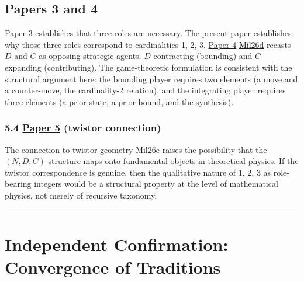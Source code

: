 \documentclass[12pt]{article}
\begin{document}
\subsection{Papers 3 and 4}\label{papers-3-and-4}

\href{https://github.com/baardev/truevalue/blob/main/docnav/Research/papers/3_minimal-recursive-triadic-framework/3_minimal-recursive-triadic-framework.pdf}{Paper
3} establishes that three roles are necessary. The present paper
establishes why those three roles correspond to cardinalities 1, 2, 3.
\href{https://github.com/baardev/truevalue/blob/main/docnav/Research/papers/4_game-theoretic-triadic-balance/4_game-theoretic-triadic-balance.pdf}{Paper
4}
\href{https://github.com/baardev/truevalue/blob/main/docnav/Research/papers/4_game-theoretic-triadic-balance/4_game-theoretic-triadic-balance.pdf}{Mil26d}
recasts \(D\) and \(C\) as opposing strategic agents: \(D\) contracting
(bounding) and \(C\) expanding (contributing). The game-theoretic
formulation is consistent with the structural argument here: the
bounding player requires two elements (a move and a counter-move, the
cardinality-2 relation), and the integrating player requires three
elements (a prior state, a prior bound, and the synthesis).

\subsubsection{\texorpdfstring{5.4
\href{https://github.com/baardev/truevalue/blob/main/docnav/Research/papers/5_tholonic-twistor-connection/5_tholonic-twistor-connection.pdf}{Paper
5} (twistor
connection)}{5.4 Paper 5 (twistor connection)}}\label{paper-5-twistor-connection}

The connection to twistor geometry
\href{https://github.com/baardev/truevalue/blob/main/docnav/Research/papers/5_tholonic-twistor-connection/5_tholonic-twistor-connection.pdf}{Mil26e}
raises the possibility that the \((N, D, C)\) structure maps onto
fundamental objects in theoretical physics. If the twistor
correspondence is genuine, then the qualitative nature of 1, 2, 3 as
role-bearing integers would be a structural property at the level of
mathematical physics, not merely of recursive taxonomy.

\begin{center}\rule{0.5\linewidth}{0.5pt}\end{center}

\section{Independent Confirmation: Convergence of Traditions}\label{independent-confirmation-convergence-of-traditions}
\end{document}
